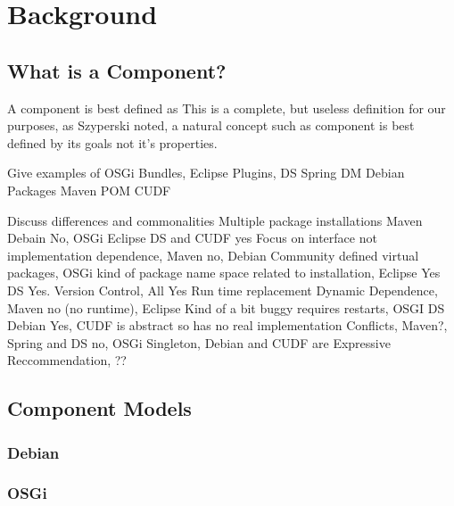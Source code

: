 \chapter{Background}

\section{What is a Component?}

A component is best defined as
This is a complete, but useless definition for our purposes, 
as Szyperski noted, a natural concept such as component is best defined by its goals not it's properties. %


Give examples of OSGi Bundles, Eclipse Plugins, DS
Spring DM
Debian Packages
Maven POM
CUDF

Discuss differences and commonalities
Multiple package installations Maven Debain No, OSGi Eclipse DS and CUDF yes
Focus on interface not implementation dependence, Maven no, Debian Community defined virtual packages, 
OSGi kind of package name space related to installation, Eclipse Yes DS Yes.
Version Control, All Yes
Run time replacement Dynamic Dependence, Maven no (no runtime), Eclipse Kind of a bit buggy requires restarts,
OSGI DS Debian Yes, CUDF is abstract so has no real implementation
Conflicts, Maven?, Spring and DS no,  OSGi Singleton, Debian and CUDF are Expressive
Reccommendation, ??

\section{Component Models}

\subsection{Debian}


\subsection{OSGi}

